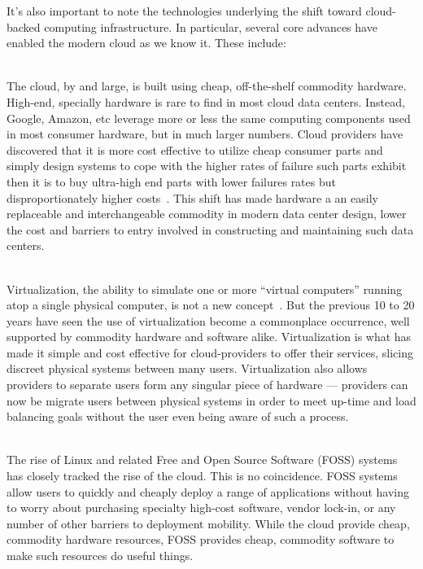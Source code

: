 It's also important to note the technologies underlying the shift
toward cloud-backed computing infrastructure. In particular, several
core advances have enabled the modern cloud as we know it. These
include:

\begin{packed_desc}
\item[Commoditization of Hardware] \hfill \\ The cloud, by and large,
  is built using cheap, off-the-shelf commodity hardware. High-end,
  specially hardware is rare to find in most cloud data
  centers. Instead, Google, Amazon, etc leverage more or less the same
  computing components used in most consumer hardware, but in much
  larger numbers. Cloud providers have discovered that it is more cost
  effective to utilize cheap consumer parts and simply design systems
  to cope with the higher rates of failure such parts exhibit then it
  is to buy ultra-high end parts with lower failures rates but
  disproportionately higher costs~\cite{}. This shift has made
  hardware a an easily replaceable and interchangeable commodity in
  modern data center design, lower the cost and barriers to entry
  involved in constructing and maintaining such data centers.
\item[Virtualization] \hfill \\ Virtualization, the ability to
  simulate one or more ``virtual computers'' running atop a single
  physical computer, is not a new concept~\cite{goldberg1974}. But the
  previous 10 to 20 years have seen the use of virtualization become a
  commonplace occurrence, well supported by commodity hardware and
  software alike. Virtualization is what has made it simple and cost
  effective for cloud-providers to offer their services, slicing
  discreet physical systems between many users. Virtualization also
  allows providers to separate users form any singular piece of
  hardware --- providers can now be migrate users between physical
  systems in order to meet up-time and load balancing goals without
  the user even being aware of such a process.
\item[Free and Open Source Software] \hfill \\ The rise of Linux and
  related Free and Open Source Software (FOSS) systems has closely
  tracked the rise of the cloud. This is no coincidence. FOSS systems
  allow users to quickly and cheaply deploy a range of applications
  without having to worry about purchasing specialty high-cost
  software, vendor lock-in, or any number of other barriers to
  deployment mobility. While the cloud provide cheap, commodity
  hardware resources, FOSS provides cheap, commodity software to make
  such resources do useful things.
\end{packed_desc}


